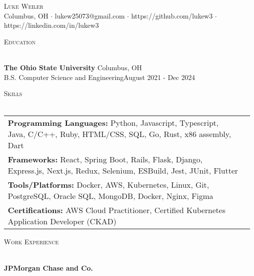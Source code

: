 \documentclass[letterpaper]{article}
\newcommand{\lineunder} {
    \vspace*{-8pt} \\
    \hspace*{-18pt} \hrulefill \\
}
\newcommand{\header} [1] {
    {\hspace*{-18pt}\vspace*{6pt} \textsc{#1}}
    \vspace*{-6pt} \lineunder
}
\begin{document}
\vspace*{-40pt}

\vspace*{-10pt}
\begin{center}
	{\Huge \scshape {Luke Weiler}}\\
	Columbus, OH $\cdot$ lukew25073@gmail.com $\cdot$ https://github.com/lukew3 $\cdot$ https://linkedin.com/in/lukew3\\
\end{center}

\header{Education}
\vspace{1mm}

    \textbf{The Ohio State University} \hfill Columbus, OH\\
    B.S. Computer Science and Engineering\hfill \hfill August 2021 - Dec 2024\\
    \vspace{2mm}


\header{Skills}
\vspace{1.5mm}
\hspace{-3mm}
\begin{tabular}{ l l }

    \textbf{Programming Languages:} Python, Javascript, Typescript, Java, C/C++, Ruby, HTML/CSS, SQL, Go, Rust, x86 assembly, Dart \\

    \textbf{Frameworks:} React, Spring Boot, Rails, Flask, Django, Express.js, Next.js, Redux, Selenium, ESBuild, Jest, JUnit, Flutter  \\

    \textbf{Tools/Platforms:} Docker, AWS, Kubernetes, Linux, Git, PostgreSQL, Oracle SQL, MongoDB, Docker, Nginx, Figma  \\

    \textbf{Certifications:} AWS Cloud Practitioner, Certified Kubernetes Application Developer (CKAD)  \\

\end{tabular}
\vspace{2mm}

\header{Work Experience}
\vspace{1mm}

    \textbf{JPMorgan Chase and Co.}\\
    
\end{document}
